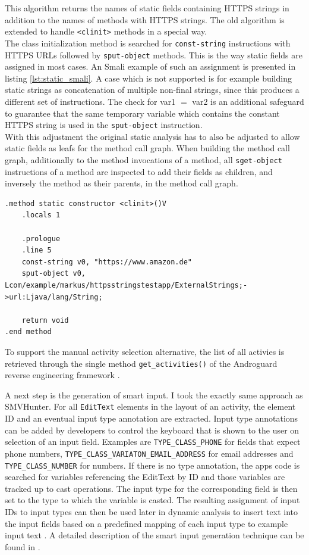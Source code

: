 \documentclass[draft,final]{vutinfth} %
\begin{document}
This algorithm returns the names of static fields containing HTTPS strings in addition to the names of methods with HTTPS strings. The old algorithm is extended to handle \texttt{<clinit>} methods in a special way.\\
The class initialization method is searched for \texttt{const-string} instructions with HTTPS URLs followed by \texttt{sput-object} methods. This is the way static fields are assigned in most cases. An Smali example of such an assignment is presented in listing \ref{lst:static_smali}. A case which is not supported is for example building static strings as concatenation of multiple non-final strings, since this produces a different set of instructions. The check for var1 $=$ var2 is an additional safeguard to guarantee that the same temporary variable which contains the constant HTTPS string is used in the \texttt{sput-object} instruction.\\
With this adjustment the original static analysis has to also be adjusted to allow static fields as leafs for the method call graph. When building the method call graph, additionally to the method invocations of a method, all \texttt{sget-object} instructions of a method are inspected to add their fields as children, and inversely the method as their parents, in the method call graph.

\begin{lstlisting}[caption={Smali code for static field initialization},label={lst:static_smali},frame=tb,columns=fullflexible,breaklines]
.method static constructor <clinit>()V
	.locals 1

	.prologue
	.line 5
	const-string v0, "https://www.amazon.de"
	sput-object v0, Lcom/example/markus/httpsstringstestapp/ExternalStrings;->url:Ljava/lang/String;

	return void
.end method
\end{lstlisting}

To support the manual activity selection alternative, the list of all activies is retrieved through the single method \texttt{get\_activities()} of the Androguard reverse engineering framework \cite{Androguard}.

A next step is the generation of smart input. I took the exactly same approach as SMVHunter. For all \texttt{EditText} elements in the layout of an activity, the element ID and an eventual input type annotation are extracted. Input type annotations can be added by developers to control the keyboard that is shown to the user on selection of an input field. Examples are \texttt{TYPE\_CLASS\_PHONE} for fields that expect phone numbers, \texttt{TYPE\_CLASS\_VARIATON\_EMAIL\_ADDRESS} for email addresses and \texttt{TYPE\_CLASS\_NUMBER} for numbers. If there is no type annotation, the apps code is searched for variables referencing the EditText by ID and those variables are tracked up to cast operations. The input type for the corresponding field is then set to the type to which the variable is casted. The resulting assignment of input IDs to input types can then be used later in dynamic analysis to insert text into the input fields based on a predefined mapping of each input type to example input text . A detailed description of the smart input generation technique can be found in \cite{Sounthiraraj}.
\end{document}
